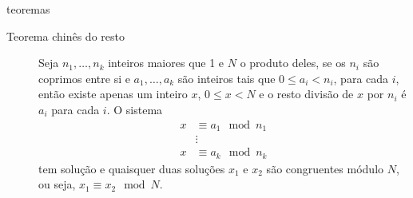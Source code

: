 \documentclass[portuguese,aspectratio=169]{beamer}
\begin{document}
\begin{frame}[allowframebreaks]
\framebreak
\begin{block}{teoremas}
  \begin{description}
  \item[Teorema chinês do resto] Seja $n_1,\ldots,n_k$ inteiros maiores que 1 e $N$ o produto deles,
    se os $n_i$ são coprimos entre si e $a_1,\ldots,a_k$ são inteiros tais que $0 \leq a_i < n_i$, para cada $i$,
    então existe apenas um inteiro $x$, $0 \leq x < N$ e o resto divisão de $x$ por $n_i$ é $a_i$ para cada $i$.
    O sistema
    \begin{eqnarray}
      x &\equiv a_1 \mod n_1 \\
        & \vdots \nonumber\\
      x &\equiv a_k \mod n_k \nonumber
    \end{eqnarray}
    tem solução e quaisquer duas soluções $x_1$ e $x_2$ são congruentes módulo $N$, ou seja, $x_1 \equiv x_2 \mod N$.
\end{description}
\end{block}

\end{frame}
\end{document}

